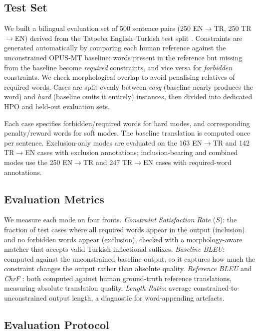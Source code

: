 \documentclass{CUP-JNL-NLP}
\begin{document}
\subsection{Test Set}

We built a bilingual evaluation set of 500 sentence pairs (250 EN$\rightarrow$TR,
250 TR$\rightarrow$EN) derived from the Tatoeba English--Turkish test split
\citep{tiedemann2020tatoeba}. Constraints are generated automatically by comparing
each human reference against the unconstrained OPUS-MT baseline: words present in
the reference but missing from the baseline become \emph{required} constraints, and
vice versa for \emph{forbidden} constraints. We check morphological overlap to avoid
penalising relatives of required words. Cases are split evenly between \emph{easy}
(baseline nearly produces the word) and \emph{hard} (baseline omits it entirely)
instances, then divided into dedicated HPO and held-out evaluation sets.

Each case specifies forbidden/required words for hard modes, and corresponding
penalty/reward words for soft modes. The baseline translation is computed once per
sentence. Exclusion-only modes are evaluated on the 163 EN$\rightarrow$TR and 142
TR$\rightarrow$EN cases with exclusion annotations; inclusion-bearing and combined
modes use the 250 EN$\rightarrow$TR and 247 TR$\rightarrow$EN cases with
required-word annotations.

\subsection{Evaluation Metrics}

We measure each mode on four fronts. \emph{Constraint Satisfaction Rate} ($S$): the
fraction of test cases where all required words appear in the output (inclusion) and
no forbidden words appear (exclusion), checked with a morphology-aware matcher that
accepts valid Turkish inflectional suffixes. \emph{Baseline BLEU}: computed against
the unconstrained baseline output, so it captures how much the constraint changes the
output rather than absolute quality. \emph{Reference BLEU} \citep{papineni2002bleu}
and \emph{ChrF} \citep{popovic2015chrf}: both computed against human ground-truth
reference translations, measuring absolute translation quality. \emph{Length Ratio}:
average constrained-to-unconstrained output length, a diagnostic for word-appending
artefacts.

\subsection{Evaluation Protocol}
\end{document}
